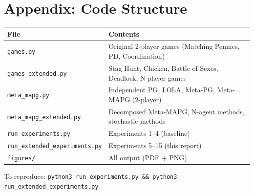 \documentclass[11pt,a4paper]{article}
\begin{document}
\newpage
\section{Appendix: Code Structure}

\begin{center}
\begin{tabular}{ll}
\toprule
\textbf{File} & \textbf{Contents} \\
\midrule
\texttt{games.py} & Original 2-player games (Matching Pennies, PD, Coordination) \\
\texttt{games\_extended.py} & Stag Hunt, Chicken, Battle of Sexes, Deadlock, N-player games \\
\texttt{meta\_mapg.py} & Independent PG, LOLA, Meta-PG, Meta-MAPG (2-player) \\
\texttt{meta\_mapg\_extended.py} & Decomposed Meta-MAPG, N-agent methods, stochastic methods \\
\texttt{run\_experiments.py} & Experiments 1--4 (baseline) \\
\texttt{run\_extended\_experiments.py} & Experiments 5--15 (this report) \\
\texttt{figures/} & All output (PDF + PNG) \\
\bottomrule
\end{tabular}
\end{center}

\noindent To reproduce: \texttt{python3 run\_experiments.py \&\& python3 run\_extended\_experiments.py}
\end{document}
